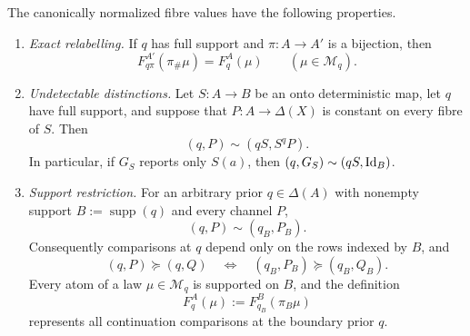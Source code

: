 \begin{lemma}
\label{pt:lem:transport}\label{pt:lem:actionbase}\label{pt:lem:neutrality}\label{pt:lem:supprestrict}
The canonically normalized fibre values have the following properties.

\begin{enumerate}[label=\textup{(\alph*)},leftmargin=*]
\item \emph{Exact relabelling.}
If $q$ has full support and $\pi:A\to A'$ is a bijection, then
\begin{equation}
 F_{q\pi}^{A'}(\pi_\#\mu)=F_q^A(\mu)
 \qquad(\mu\in\mathcal M_q).
 \label{pt:eq:exact-relabel}
\end{equation}

\item \emph{Undetectable distinctions.}
Let $S:A\to B$ be an onto deterministic map, let $q$ have full support, and
suppose that $P:A\to\Delta(X)$ is constant on every fibre of $S$.  Then
\begin{equation}
 (q,P)\sim(qS,S^qP).
 \label{pt:eq:undetectable}
\end{equation}
In particular, if $G_S$ reports only $S(a)$, then
$(q,G_S)\sim(qS,\operatorname{Id}_B)$.

\item \emph{Support restriction.}
For an arbitrary prior $q\in\Delta(A)$ with nonempty support
$B:=\operatorname{supp}(q)$ and every channel $P$,
\begin{equation}
 (q,P)\sim(q_B,P_B).
 \label{pt:eq:support-indifference}
\end{equation}
Consequently comparisons at $q$ depend only on the rows indexed by $B$, and
\begin{equation}
 (q,P)\succeq(q,Q)
 \quad\Longleftrightarrow\quad
 (q_B,P_B)\succeq(q_B,Q_B).
 \label{pt:eq:support-comparison}
\end{equation}
Every atom of a law $\mu\in\mathcal M_q$ is supported on $B$, and the
definition
\begin{equation}
 F_q^A(\mu):=F_{q_B}^{B}(\pi_B\mu)
 \label{pt:eq:boundary-representative}
\end{equation}
represents all continuation comparisons at the boundary prior $q$.
\end{enumerate}
\end{lemma}

